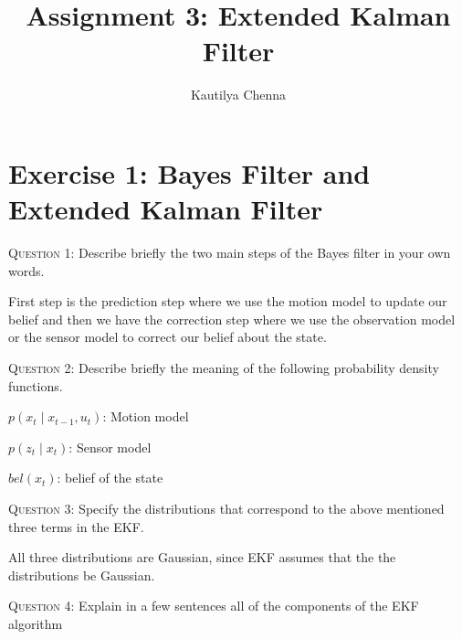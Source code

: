 \documentclass{tufte-handout}
\title{Assignment 3: Extended Kalman Filter}
\author[Kautilya Chenna]{Kautilya Chenna}
\begin{document}
\maketitle%

\section{Exercise 1: Bayes Filter and Extended Kalman Filter}
\begin{fullwidth}
\textsc{Question 1}: Describe briefly the two main steps of the Bayes filter in your own words.
\end{fullwidth}

First step is the prediction step where we use the motion model to update our belief and then we have the correction step where we use the observation model or the sensor model to correct our belief about the state.


\begin{fullwidth}
\textsc{Question 2}: Describe briefly the meaning of the following probability density functions.
\end{fullwidth}

$p(x_t \mid x_{t-1},u_t)$: Motion model

$p(z_t\mid x_t)$: Sensor model

$bel(x_t)$: belief of the state

\begin{fullwidth}
\textsc{Question 3}: Specify the distributions that correspond to the above mentioned three terms in the EKF.
\end{fullwidth}

All three distributions are Gaussian, since EKF assumes that the the distributions be Gaussian.

\begin{fullwidth}
	\textsc{Question 4}: Explain in a few sentences all of the components of the EKF algorithm
\end{fullwidth}
\end{document}
